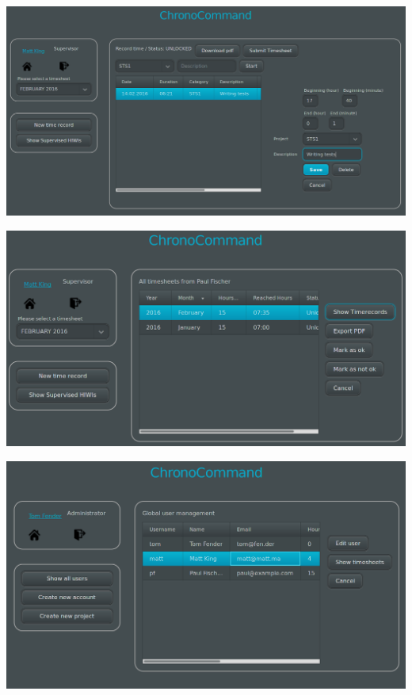\begin{frame}
	\begin{center}
		\includegraphics[width=\linewidth,height=0.9\textheight,keepaspectratio]{images/timerecord-edit.png}
	\end{center}
\end{frame}

\begin{frame}
	\begin{center}
		\includegraphics[width=\linewidth,height=0.9\textheight,keepaspectratio]{images/timesheets-overview.png}
	\end{center}
\end{frame}


\begin{frame}
	\begin{center}
		\includegraphics[width=\linewidth,height=0.9\textheight,keepaspectratio]{images/admin-overview.png}
	\end{center}
\end{frame}

